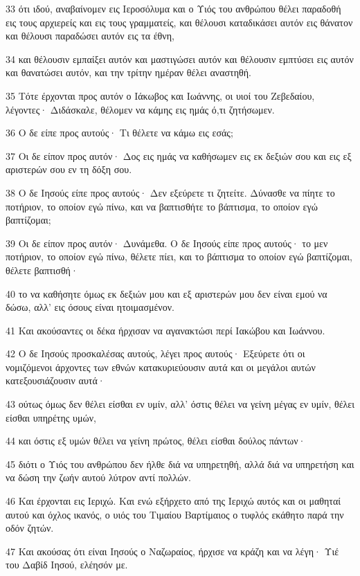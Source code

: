 \par 33 ότι ιδού, αναβαίνομεν εις Ιεροσόλυμα και ο Υιός του ανθρώπου θέλει παραδοθή εις τους αρχιερείς και εις τους γραμματείς, και θέλουσι καταδικάσει αυτόν εις θάνατον και θέλουσι παραδώσει αυτόν εις τα έθνη,
\par 34 και θέλουσιν εμπαίξει αυτόν και μαστιγώσει αυτόν και θέλουσιν εμπτύσει εις αυτόν και θανατώσει αυτόν, και την τρίτην ημέραν θέλει αναστηθή.
\par 35 Τότε έρχονται προς αυτόν ο Ιάκωβος και Ιωάννης, οι υιοί του Ζεβεδαίου, λέγοντες· Διδάσκαλε, θέλομεν να κάμης εις ημάς ό,τι ζητήσωμεν.
\par 36 Ο δε είπε προς αυτούς· Τι θέλετε να κάμω εις εσάς;
\par 37 Οι δε είπον προς αυτόν· Δος εις ημάς να καθήσωμεν εις εκ δεξιών σου και εις εξ αριστερών σου εν τη δόξη σου.
\par 38 Ο δε Ιησούς είπε προς αυτούς· Δεν εξεύρετε τι ζητείτε. Δύνασθε να πίητε το ποτήριον, το οποίον εγώ πίνω, και να βαπτισθήτε το βάπτισμα, το οποίον εγώ βαπτίζομαι;
\par 39 Οι δε είπον προς αυτόν· Δυνάμεθα. Ο δε Ιησούς είπε προς αυτούς· το μεν ποτήριον, το οποίον εγώ πίνω, θέλετε πίει, και το βάπτισμα το οποίον εγώ βαπτίζομαι, θέλετε βαπτισθή·
\par 40 το να καθήσητε όμως εκ δεξιών μου και εξ αριστερών μου δεν είναι εμού να δώσω, αλλ' εις όσους είναι ητοιμασμένον.
\par 41 Και ακούσαντες οι δέκα ήρχισαν να αγανακτώσι περί Ιακώβου και Ιωάννου.
\par 42 Ο δε Ιησούς προσκαλέσας αυτούς, λέγει προς αυτούς· Εξεύρετε ότι οι νομιζόμενοι άρχοντες των εθνών κατακυριεύουσιν αυτά και οι μεγάλοι αυτών κατεξουσιάζουσιν αυτά·
\par 43 ούτως όμως δεν θέλει είσθαι εν υμίν, αλλ' όστις θέλει να γείνη μέγας εν υμίν, θέλει είσθαι υπηρέτης υμών,
\par 44 και όστις εξ υμών θέλει να γείνη πρώτος, θέλει είσθαι δούλος πάντων·
\par 45 διότι ο Υιός του ανθρώπου δεν ήλθε διά να υπηρετηθή, αλλά διά να υπηρετήση και να δώση την ζωήν αυτού λύτρον αντί πολλών.
\par 46 Και έρχονται εις Ιεριχώ. Και ενώ εξήρχετο από της Ιεριχώ αυτός και οι μαθηταί αυτού και όχλος ικανός, ο υιός του Τιμαίου Βαρτίμαιος ο τυφλός εκάθητο παρά την οδόν ζητών.
\par 47 Και ακούσας ότι είναι Ιησούς ο Ναζωραίος, ήρχισε να κράζη και να λέγη· Υιέ του Δαβίδ Ιησού, ελέησόν με.
